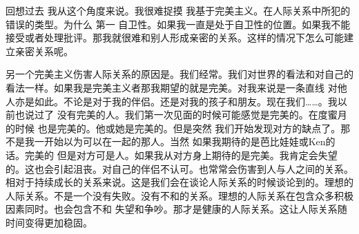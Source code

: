 回想过去 我从这个角度来说。我很难捉摸 我基于完美主义。在人际关系中所犯的错误的类型。为什么 第一 自卫性。如果我一直是处于自卫性的位置。如果我不能接受或者处理批评。那我就很难和别人形成亲密的关系。这样的情况下怎么可能建立亲密关系呢。 

另一个完美主义伤害人际关系的原因是。我们经常。我们对世界的看法和对自己的看法一样。如果我是完美主义者那我期望的就是完美。对我来说是一条直线 对他人亦是如此。不论是对于我的伴侣。还是对我的孩子和朋友。现在我们……。我以前也说过了 没有完美的人。我们第一次见面的时候可能感觉是完美的。在度蜜月的时候 也是完美的。他或她是完美的。但是突然 我们开始发现对方的缺点了。那不是我一开始以为可以在一起的那人。当然 如果我期待的是芭比娃娃或Ken的话。完美的 但是对方可是人。如果我从对方身上期待的是完美。我肯定会失望的。这也会引起沮丧。对自己的伴侣不认可。也常常会伤害到人与人之间的关系。相对于持续成长的关系来说。这是我们会在谈论人际关系的时候谈论到的。理想的人际关系。不是一个没有失败。没有不和的关系。理想的人际关系在包含众多积极因素同时。也会包含不和 失望和争吵。那才是健康的人际关系。这让人际关系随时间变得更加稳固。 

